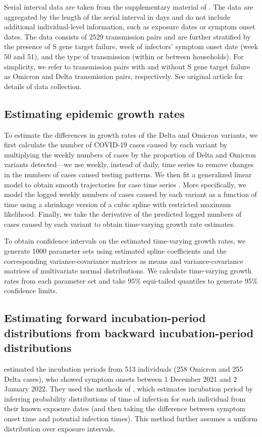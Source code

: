 \documentclass[12pt]{article}
\begin{document}
Serial interval data are taken from the supplementary material of \cite{backer2021omicron}.
The data are aggregated by the length of the serial interval in days and do not include additional individual-level information, such as exposure dates or symptom onset dates.
The data consists of 2529 transmission pairs and are further stratified by the presence of S gene target failure, week of infectors' symptom onset date (week 50 and 51), and the type of transmission (within or between households).
For simplicity, we refer to transmission pairs with and without S gene target failure as Omicron and Delta transmission pairs, respectively.
See original article for details of data collection.

\subsection{Estimating epidemic growth rates}

To estimate the differences in growth rates of the Delta and Omicron variants, we first calculate the number of COVID-19 cases caused by each variant by multiplying the weekly numbers of cases by the proportion of Delta and Omicron variants detected---we use weekly, instead of daily, time series to remove changes in the numbers of cases caused testing patterns.
We then fit a generalized linear model to obtain smooth trajectories for case time series \citep{wood2001mgcv}.
More specifically, we model the logged weekly numbers of cases caused by each variant as a function of time using a shrinkage version of a cubic spline with restricted maximum likelihood.
Finally, we take the derivative of the predicted logged numbers of cases caused by each variant to obtain time-varying growth rate estimates.

To obtain confidence intervals on the estimated time-varying growth rates, we generate 1000 parameter sets using estimated spline coefficients and the corresponding variance-covariance matrices as means and variance-covariance matrices of multivariate normal distributions.
We calculate time-varying growth rates from each parameter set and take 95\% equi-tailed quantiles to generate 95\% confidence limits. 

\subsection{Estimating forward incubation-period distributions from backward incubation-period distributions}

\cite{backer2021omicron} estimated the incubation periods from 513 individuals (258 Omicron and 255 Delta cases), who showed symptom onsets between 1 December 2021 and 2 January 2022.
They used the methods of \cite{backer2020incubation}, which estimates incubation period by inferring probability distributions of time of infection for each individual from their known exposure dates (and then taking the difference between symptom onset time and potential infection times). 
This method further assumes a uniform distribution over exposure intervals.
\end{document}
